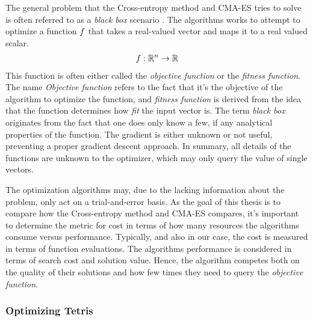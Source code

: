 The general problem that the Cross-entropy method and CMA-ES 
tries to solve is often referred  to as a \textit{black box}
scenario \citep{hansen2011}. The algorithms works to 
attempt to optimize a function $f$ that takes
a real-valued vector and maps it to a real valued scalar.
\begin{align*}
f : \mathbb{R}^{n} \rightarrow \mathbb{R}
\end{align*}
This function is often either called the \textit{objective function}
or the \textit{fitness function}. The name \textit{Objective function}
refers to the fact that it's the objective of the algorithm to optimize
the function, and \textit{fitness function} is derived from the
idea that the function determines how \textit{fit} the input vector
is. The term \textit{black box} originates from the fact that 
one does only know a few, if any analytical properties of the function.
The gradient is either unknown or not useful, preventing a 
proper gradient 
descent approach. In summary, all details of the functions are unknown to 
the optimizer, which may only query the value of single vectors.
\begin{figure}[H]
\centering
{}
\end{figure}
The optimization algorithms may, due to the lacking information about the
problem, only act on a trial-and-error basis. As the goal of this
thesis is to compare how the Cross-entropy method and CMA-ES compares, 
it's important to determine the metric for cost in terms of 
how many resources the algorithms consume versus performance.
Typically, and also in our case, the cost is measured in terms 
of function evaluations. The algorithms performance is considered 
in terms of search cost and solution value. Hence, the algorithm 
competes both on the quality of their solutions and how few times
they need to query the \textit{objective function}.


\subsubsection{Optimizing Tetris}


